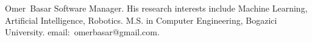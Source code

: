 \documentclass[journal,comsoc]{IEEEtran}
\begin{document}
\begin{IEEEbiographynophoto}{Omer~Basar}
	Software Manager.
	His research interests include 
	Machine Learning, 
	Artificial Intelligence, 
	Robotics.
	M.S. in Computer Engineering, Bogazici University.
	email:~omerbasar@gmail.com.	
\end{IEEEbiographynophoto}







\end{document}
